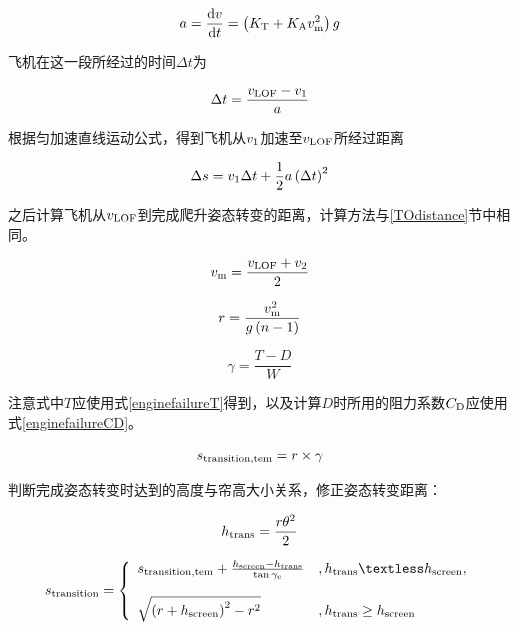 \documentclass[a4paper,punct,space,heading=true,AutoFakeBold]{ctexrep}
\begin{document}
\begin{equation}\label{acceleration}
a=\frac{{\rm d}v}{{\rm d}t}=\left(K_{\rm T}+K_{\rm A}v_{\rm m}^2\right)g
\end{equation}

飞机在这一段所经过的时间$\Delta t$为

\begin{equation}
\Delta t=\frac{v_{\rm LOF}-v_{\rm 1}}{a}
\end{equation}

根据匀加速直线运动公式，得到飞机从$v_{\rm 1}$加速至$v_{\rm LOF}$所经过距离

\begin{equation}
\Delta s=v_{\rm 1}\Delta t+\frac{1}{2}a\left(\Delta t\right)^2
\end{equation}

之后计算飞机从$v_{\rm LOF}$到完成爬升姿态转变的距离，计算方法与\ref{TOdistance}节中相同。

\begin{equation}
v_{\rm m}=\frac{v_{\rm LOF}+v_{\rm 2}}{2}
\end{equation}

\begin{equation}
r=\frac{v_{\rm m}^2}{g\left(n-1\right)}
\end{equation}

\begin{equation}
\gamma=\frac{T-D}{W}
\end{equation}

注意式中$T$应使用式\ref{enginefailureT}得到，以及计算$D$时所用的阻力系数$C_{\rm D}$应使用式\ref{enginefailureCD}。

\begin{equation}
s_{\rm transition,tem}=r\times\gamma
\end{equation}

判断完成姿态转变时达到的高度与帘高大小关系，修正姿态转变距离：

\begin{equation}
h_{\rm trans}=\frac{r\theta^2}{2}
\end{equation}

\begin{equation}
s_{\rm transition}=\left\{\begin{array}{ll}
s_{\rm transition,tem}+\frac{h_{\rm screen}-h_{\rm trans}}{\tan\gamma_{\rm c}}   &   , h_{\rm trans}\textless h_{\rm screen},\\   
&\\ 
\sqrt{\left(r+h_{\rm screen}\right)^2-r^2}   &   , h_{\rm trans}\geq h_{\rm screen}
\end{array}\right.
\end{equation}
\end{document}
